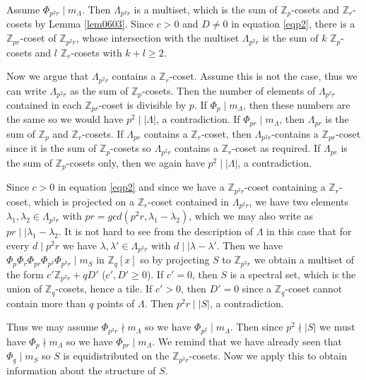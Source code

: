 \documentclass[10pt]{article}
\newcommand{\Z}{\mathbb{Z}}
\newcommand{\La}{\Lambda}
\newcommand{\la}{\lambda}
\begin{document}
        Assume $\Phi_{p^2r} \mid m_{\La}$. Then $\La_{p^2r}$ is a multiset, which is the sum of $\Z_p$-cosets and $\Z_r$-cosets by Lemma \ref{lem0603}. Since $c>0$ and $D\ne0$ in equation \eqref{eqp2}, there is a $\Z_{pr}$-coset of $\Z_{p^2r}$, whose intersection with the multiset $\La_{p^2r}$ is the sum of $k$ $\Z_p$-cosets and $l$ $\Z_r$-cosets with $k+l \ge 2$. 
        
        Now we argue that $\La_{p^2r}$ contains a $\Z_r$-coset. Assume this is not the case, thus we can write  $\La_{p^2r}$ as the sum of $\Z_p$-cosets. Then the number of elements of $\La_{p^2r}$ contained in each  $\Z_{pr}$-coset is divisible by $p$.
        If $\Phi_p \mid m_{\La}$, then these numbers are the same so we would have $p^2 \mid |\La|$, a contradiction. If $\Phi_{pr} \mid m_{\La}$, then $\La_{pr}$ is the sum of $\Z_p$ and $\Z_r$-cosets. 
        If $\La_{pr}$ contains a $\Z_r$-coset, then $\La_{p^2r}$-contains a $\Z_{pr}$-coset since it is the sum of $\Z_p$-cosets so $\La_{p^2r}$ contains a $\Z_r$-coset as required. 
        If $\La_{pr}$ is the sum of $\Z_p$-cosets only, then we again have $p^2 \mid |\La|$, a contradiction.
        
        Since $c>0$ in equation \eqref{eqp2} and since we have a $\Z_{p^2r}$-coset containing a $\Z_r$-coset, which is projected on a $\Z_r$-coset contained in $\La_{p^2r}$, we have two elements  $\la_1,\la_2 \in \La_{p^2r}$ with $pr=gcd(p^2r,\la_1-\la_2) $, which we may also write as $pr \mid\mid \la_1-\la_2$. 
        It is not hard to see from the description of $\La $ in this case that for every $d \mid p^2r$ we have $\la,\la' \in \La_{p^2r}$ with $d \mid \mid \la-\la'$. 
        Then we have $\Phi_p \Phi_{r}\Phi_{pr}\Phi_{p^2}\Phi_{p^2r} \mid m_{S}$ in $\Z_q[x]$ so by projecting $S$ to $\Z_{p^2r}$ we obtain a multiset of the form $c'\Z_{p^2r}+qD'$ ($c',D' \ge0$). If $c'=0$, then $S$ is a spectral set, which is the union of $\Z_q$-cosets, hence a tile. If $c'>0$, then $D'=0$ since a $\Z_q$-coset cannot contain more than $q$ points of $\La$.
        Then $p^2r \mid |S|$, a contradiction.
        
        Thus we may assume $\Phi_{p^2r} \nmid m_{\La}$ so we have $\Phi_{p^2} \mid m_{\La}$. Then since $p^2 \nmid |S|$ we must have $\Phi_p \nmid m_{\La}$ so we have $\Phi_{pr} \mid m_{\La}$. We remind that we have already seen that $\Phi_q \mid m_S$ so $S$ is equidistributed on the $\Z_{p^2r}$-cosets. 
        Now we apply this to obtain information about the structure of $S$.
        
\end{document}
